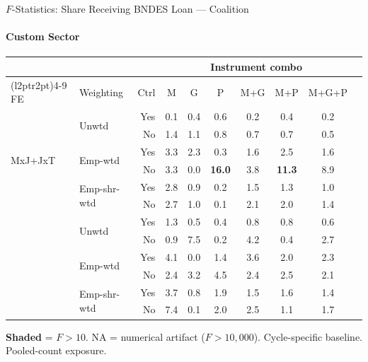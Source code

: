 \documentclass[aspectratio=169,10pt]{beamer}
\newcommand{\fpass}[1]{\cellcolor{pass}\textbf{#1}}
\begin{document}
\begin{frame}[t]{$F$-Statistics: Share Receiving BNDES Loan --- Coalition}
\framesubtitle{Custom Sector}
\begin{center}
\footnotesize
\setlength{\tabcolsep}{3.5pt}
\renewcommand{\arraystretch}{1.05}
\begin{tabular}{@{}llrccccccc@{}}
\toprule
 & & & \multicolumn{6}{c}{Instrument combo} \\
\cmidrule(l{2pt}r{2pt}){4-9}
FE & Weighting & Ctrl & M & G & P & M+G & M+P & M+G+P \\
\midrule
  \multirow{6}{*}{MxJ+JxT} & \multirow{2}{*}{Unwtd} & Yes & 0.1 & 0.4 & 0.6 & 0.2 & 0.4 & 0.2 \\
   &  & No & 1.4 & 1.1 & 0.8 & 0.7 & 0.7 & 0.5 \\
   & \multirow{2}{*}{Emp-wtd} & Yes & 3.3 & 2.3 & 0.3 & 1.6 & 2.5 & 1.6 \\
   &  & No & 3.3 & 0.0 & \fpass{16.0} & 3.8 & \fpass{11.3} & 8.9 \\
   & \multirow{2}{*}{Emp-shr-wtd} & Yes & 2.8 & 0.9 & 0.2 & 1.5 & 1.3 & 1.0 \\
   &  & No & 2.7 & 1.0 & 0.1 & 2.1 & 2.0 & 1.4 \\
\addlinespace[5pt]
  \multirow{6}{*}{MxJ+MxT} & \multirow{2}{*}{Unwtd} & Yes & 1.3 & 0.5 & 0.4 & 0.8 & 0.8 & 0.6 \\
   &  & No & 0.9 & 7.5 & 0.2 & 4.2 & 0.4 & 2.7 \\
   & \multirow{2}{*}{Emp-wtd} & Yes & 4.1 & 0.0 & 1.4 & 3.6 & 2.0 & 2.3 \\
   &  & No & 2.4 & 3.2 & 4.5 & 2.4 & 2.5 & 2.1 \\
   & \multirow{2}{*}{Emp-shr-wtd} & Yes & 3.7 & 0.8 & 1.9 & 1.5 & 1.6 & 1.4 \\
   &  & No & 7.4 & 0.1 & 2.0 & 2.5 & 1.1 & 1.7 \\
\bottomrule
\end{tabular}
\end{center}
{\scriptsize \colorbox{pass}{\textbf{Shaded}} = $F>10$. NA = numerical artifact ($F>10{,}000$). Cycle-specific baseline. Pooled-count exposure.}
\end{frame}
\end{document}
